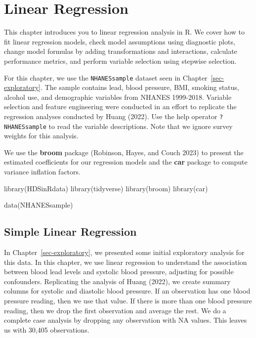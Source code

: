 \documentclass[
  letterpaper,
]{latex/krantz}
\makeatletter
\newenvironment{Shaded}{\begin{snugshade}}{\end{snugshade}}
\newcommand{\FunctionTok}[1]{\textcolor[rgb]{0.28,0.35,0.67}{#1}}
\newcommand{\NormalTok}[1]{\textcolor[rgb]{0.00,0.23,0.31}{#1}}
\newenvironment{kframe}{%
\medskip{}
\setlength{\fboxsep}{.8em}
 \def\at@end@of@kframe{}%
 \ifinner\ifhmode%
  \def\at@end@of@kframe{\end{minipage}}%
  \begin{minipage}{\columnwidth}%
 \fi\fi%
 \def\FrameCommand##1{\hskip\@totalleftmargin \hskip-\fboxsep
 \colorbox{shadecolor}{##1}\hskip-\fboxsep
     \hskip-\linewidth \hskip-\@totalleftmargin \hskip\columnwidth}%
 \MakeFramed {\advance\hsize-\width
   \@totalleftmargin\z@ \linewidth\hsize
   \@setminipage}}%
 {\par\unskip\endMakeFramed%
 \at@end@of@kframe}
\renewenvironment{Shaded}{\begin{kframe}}{\end{kframe}}
\makeatother
\begin{document}
\chapter{Linear Regression}\label{sec-linear-regression}

This chapter introduces you to linear
regression analysis in R. We cover how to fit
linear regression models, check model assumptions using diagnostic
plots, change model formulas by adding transformations and interactions,
calculate performance metrics, and perform variable selection using
stepwise selection.

For this chapter, we use the \texttt{NHANESsample} dataset
 seen in
Chapter~\ref{sec-exploratory}. The sample contains lead, blood pressure,
BMI, smoking status, alcohol use, and demographic variables from NHANES
1999-2018. Variable selection and feature engineering were conducted in
an effort to replicate the regression analyses conducted by Huang
(2022). Use the help operator \texttt{?NHANESsample} to read the
variable descriptions. Note that we ignore survey weights for this
analysis.

We use the \textbf{broom} package (Robinson,
Hayes, and Couch 2023) to present the estimated coefficients for our
regression models and the \textbf{car} package to
compute variance inflation factors.

\begin{Shaded}
\begin{Highlighting}[]
\FunctionTok{library}\NormalTok{(HDSinRdata)}
\FunctionTok{library}\NormalTok{(tidyverse)}
\FunctionTok{library}\NormalTok{(broom)}
\FunctionTok{library}\NormalTok{(car)}

\FunctionTok{data}\NormalTok{(NHANESsample)}
\end{Highlighting}
\end{Shaded}

\section{\texorpdfstring{Simple Linear Regression
}{Simple Linear Regression }}\label{simple-linear-regression}

In Chapter~\ref{sec-exploratory}, we presented some initial exploratory
analysis for this data. In this chapter, we use linear regression to
understand the association between blood lead levels and systolic blood
pressure, adjusting for possible confounders. Replicating the analysis
of Huang (2022), we create summary columns for systolic and diastolic
blood pressure. If an observation has one blood pressure reading, then
we use that value. If there is more than one blood pressure reading,
then we drop the first observation and average the rest. We do a
complete case analysis by dropping any observation with NA values. This
leaves us with 30,405 observations.
\end{document}
